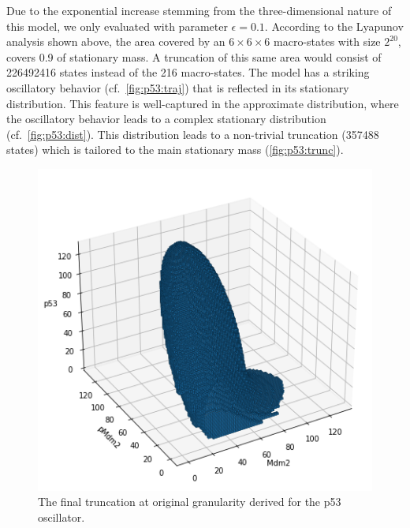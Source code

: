 Due to the exponential increase stemming from the three-di\-men\-sion\-al nature of this model, we only evaluated with parameter $\epsilon=0.1$.
According to the Lyapunov analysis shown above, the area covered by an $6\times 6\times 6$ macro-states with size $2^{20}$, covers \num{0.9} of stationary mass.
A truncation of this same area would consist of \num{226492416} states instead of the \num{216} macro-states.
The model has a striking oscillatory behavior (cf.\ \autoref{fig:p53:traj}) that is reflected in its stationary distribution.
This feature is well-captured in the approximate distribution, where the oscillatory behavior leads to a complex stationary distribution (cf.\ \autoref{fig:p53:dist}).
This distribution leads to a non-trivial truncation (\num{357488} states) which is tailored to the main stationary mass (\autoref{fig:p53:trunc}).
\begin{figure}[htb]
    \centering
    \begin{minipage}{0.9\textwidth}
    \centering
    \includegraphics[width=\textwidth]{gfx/p53_trunc.png}
    \end{minipage}
\caption{The final truncation at original granularity derived for the p53 oscillator.}
\label{fig:p53:trunc}
\end{figure}
